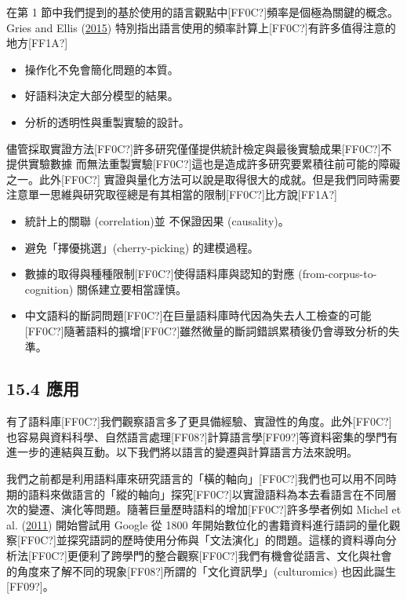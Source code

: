 在第 1 節中我們提到的基於使用的語言觀點中[FF0C?]頻率是個極為關鍵的概念。 Gries and Ellis (\hyperlink{bookmarkid2u6wntf}{2015}) 特別指出語言使用的頻率計算上[FF0C?]有許多值得注意的地方[FF1A?]

\begin{itemize}
\item 操作化不免會簡化問題的本質。

\item 好語料決定大部分模型的結果。

\item 分析的透明性與重製實驗的設計。

\end{itemize}

儘管採取實證方法[FF0C?]許多研究僅僅提供統計檢定與最後實驗成果[FF0C?]不提供實驗數據 而無法重製實驗[FF0C?]這也是造成許多研究要累積往前可能的障礙之一。此外[FF0C?] 實證與量化方法可以說是取得很大的成就。但是我們同時需要注意單一思維與研究取徑總是有其相當的限制[FF0C?]比方說[FF1A?]

\begin{itemize}
\item 統計上的關聯 (correlation)並 不保證因果 (causality)。

\item 避免「擇優挑選」(cherry-picking) 的建模過程。

\item 數據的取得與種種限制[FF0C?]使得語料庫與認知的對應 (from-corpus-to-cognition) 關係建立要相當謹慎。

\item 中文語料的斷詞問題[FF0C?]在巨量語料庫時代因為失去人工檢查的可能[FF0C?]隨著語料的擴增[FF0C?]雖然微量的斷詞錯誤累積後仍會導致分析的失準。

\end{itemize}
\subsection{15.4 應用}

有了語料庫[FF0C?]我們觀察語言多了更具備經驗、實證性的角度。此外[FF0C?]也容易與資料科學、自然語言處理[FF08?]計算語言學[FF09?]等資料密集的學門有進一步的連結與互動。以下我們將以語言的變遷與計算語言方法來說明。

我們之前都是利用語料庫來研究語言的「橫的軸向」[FF0C?]我們也可以用不同時期的語料來做語言的「縱的軸向」探究[FF0C?]以實證語料為本去看語言在不同層次的變遷、演化等問題。隨著巨量歷時語料的增加[FF0C?]許多學者例如 Michel et al. (\hyperlink{bookmarkid37m2jsg}{2011}) 開始嘗試用 Google 從 1800 年開始數位化的書籍資料進行語詞的量化觀察[FF0C?]並探究語詞的歷時使用分佈與「文法演化」的問題。這樣的資料導向分析法[FF0C?]更便利了跨學門的整合觀察[FF0C?]我們有機會從語言、文化與社會的角度來了解不同的現象[FF08?]所謂的「文化資訊學」(culturomics) 也因此誕生[FF09?]。

